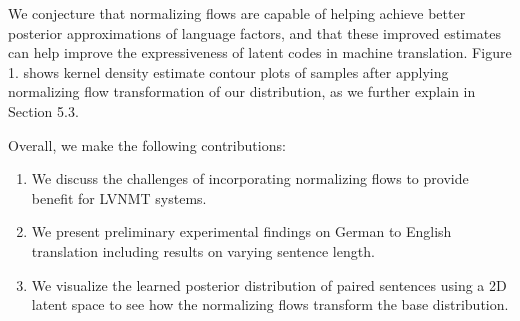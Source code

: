 We conjecture that normalizing flows are capable of helping achieve better posterior approximations of language factors, and that these improved estimates can help improve the expressiveness of latent codes in machine translation. Figure 1. shows kernel density estimate contour plots of samples after applying normalizing flow transformation
of our distribution, as we further explain in Section 5.3.



Overall, we make the following contributions:
\begin{enumerate}
	\item We discuss the challenges of incorporating normalizing flows to provide benefit for LVNMT systems. 
	
	\item We present preliminary experimental findings on German to English translation including results on varying sentence length. 
	
	\item We visualize the learned posterior distribution of paired sentences using a 2D latent space to see how the normalizing flows transform the base distribution.
\end{enumerate}

